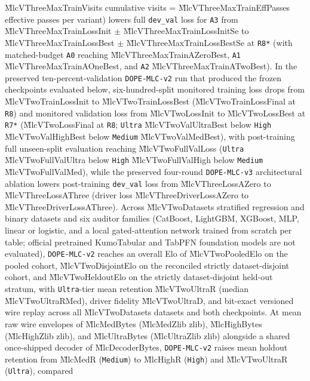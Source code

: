 \G{MlcVThreeMaxTrainVisits} cumulative visits = \G{MlcVThreeMaxTrainEffPasses} effective passes per
variant) lowers full \texttt{dev\_val} loss for \texttt{A3} from \G{MlcVThreeMaxTrainLossInit} $\pm$
\G{MlcVThreeMaxTrainLossInitSe} to \G{MlcVThreeMaxTrainLossBest} $\pm$ \G{MlcVThreeMaxTrainLossBestSe} at
\texttt{R8*} (with matched-budget \texttt{A0} reaching \G{MlcVThreeMaxTrainAZeroBest}, \texttt{A1}
\G{MlcVThreeMaxTrainAOneBest}, and \texttt{A2} \G{MlcVThreeMaxTrainATwoBest}). In the preserved
ten-percent-validation \texttt{DOPE-MLC-v2} run that produced the frozen checkpoints evaluated below,
six-hundred-split monitored training loss drops from \G{MlcVTwoTrainLossInit} to
\G{MlcVTwoTrainLossBest} (\G{MlcVTwoTrainLossFinal} at \texttt{R8}) and monitored validation loss from
\G{MlcVTwoLossInit} to \G{MlcVTwoLossBest} at \texttt{R7*} (\G{MlcVTwoLossFinal} at \texttt{R8};
\texttt{Ultra} \G{MlcVTwoValUltraBest} below \texttt{High} \G{MlcVTwoValHighBest} below
\texttt{Medium} \G{MlcVTwoValMedBest}), with post-training full unseen-split evaluation reaching
\G{MlcVTwoFullValLoss} (\texttt{Ultra} \G{MlcVTwoFullValUltra} below \texttt{High}
\G{MlcVTwoFullValHigh} below \texttt{Medium} \G{MlcVTwoFullValMed}), while the preserved
four-round \texttt{DOPE-MLC-v3} architectural ablation lowers post-training \texttt{dev\_val} loss
from \G{MlcVThreeLossAZero} to \G{MlcVThreeLossAThree} (driver loss \G{MlcVThreeDriverLossAZero} to
\G{MlcVThreeDriverLossAThree}). Across
\G{MlcVTwoDatasets} stratified regression and binary datasets and six auditor families (CatBoost,
LightGBM, XGBoost, MLP, linear or logistic, and a local gated-attention network trained from
scratch per table; official pretrained KumoTabular and TabPFN foundation models are not evaluated),
\texttt{DOPE-MLC-v2} reaches an overall Elo of \G{MlcVTwoPooledElo} on the pooled cohort,
\G{MlcVTwoDisjointElo} on the reconciled strictly dataset-disjoint cohort, and \G{MlcVTwoHeldoutElo}
on the strictly dataset-disjoint held-out stratum, with \texttt{Ultra}-tier mean retention
\G{MlcVTwoUltraR} (median \G{MlcVTwoUltraRMed}), driver fidelity \G{MlcVTwoUltraD}, and bit-exact
versioned wire replay across all \G{MlcVTwoDatasets} datasets and both checkpoints. At mean raw wire
envelopes of \G{MlcMedBytes} (\G{MlcMedZlib} zlib), \G{MlcHighBytes} (\G{MlcHighZlib} zlib), and
\G{MlcUltraBytes} (\G{MlcUltraZlib} zlib) alongside a shared once-shipped decoder of
\G{MlcDecoderBytes}, \texttt{DOPE-MLC-v2} raises mean holdout retention from \G{MlcMedR}
(\texttt{Medium}) to \G{MlcHighR} (\texttt{High}) and \G{MlcVTwoUltraR} (\texttt{Ultra}), compared

